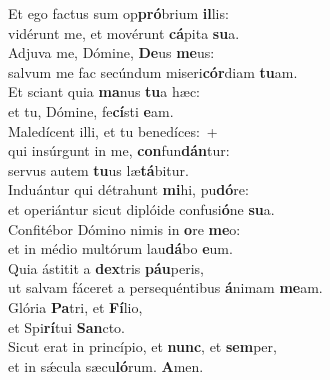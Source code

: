 \evenverse Et ego factus sum op\textbf{pró}brium \textbf{il}lis:~\*\\
\evenverse vidérunt me, et movérunt \textbf{cá}pita \textbf{su}a.\\
\oddverse Adjuva me, Dómine, \textbf{De}us \textbf{me}us:~\*\\
\oddverse salvum me fac secúndum miseri\textbf{cór}diam \textbf{tu}am.\\
\evenverse Et sciant quia \textbf{ma}nus \textbf{tu}a hæc:~\*\\
\evenverse et tu, Dómine, fe\textbf{cí}sti \textbf{e}am.\\
\oddverse Maledícent illi, et tu benedíces:~+\\
\oddverse  qui insúrgunt in me, \textbf{con}fun\textbf{dán}tur:~\*\\
\oddverse servus autem \textbf{tu}us læ\textbf{tá}bitur.\\
\evenverse Induántur qui détrahunt \textbf{mi}hi, pu\textbf{dó}re:~\*\\
\evenverse et operiántur sicut diplóide confusi\textbf{ó}ne \textbf{su}a.\\
\oddverse Confitébor Dómino nimis in \textbf{o}re \textbf{me}o:~\*\\
\oddverse et in médio multórum lau\textbf{dá}bo \textbf{e}um.\\
\evenverse Quia ástitit a \textbf{dex}tris \textbf{páu}peris,~\*\\
\evenverse ut salvam fáceret a persequéntibus \textbf{á}nimam \textbf{me}am.\\
\oddverse Glória \textbf{Pa}tri, et \textbf{Fí}lio,~\*\\
\oddverse et Spi\textbf{rí}tui \textbf{San}cto.\\
\evenverse Sicut erat in princípio, et \textbf{nunc}, et \textbf{sem}per,~\*\\
\evenverse et in sǽcula sæcu\textbf{ló}rum. \textbf{A}men.\\
